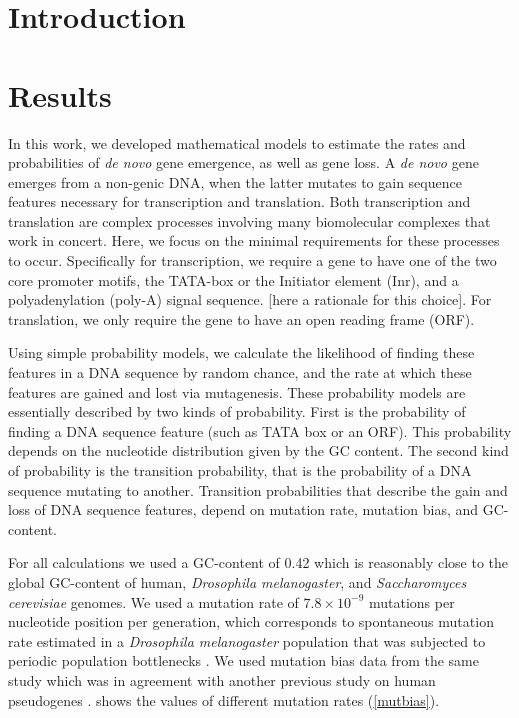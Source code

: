 \documentclass[12pt,a4paper]{article}
\begin{document}
\onehalfspacing

\setlength{\abovedisplayskip}{0pt}
\setlength{\belowdisplayskip}{1em}


\section{Introduction}

\section{Results}

In this work, we developed mathematical models to estimate the rates and probabilities of \textit{de novo} gene emergence, as well as gene loss. A \textit{de novo} gene emerges from a non-genic DNA, when the latter mutates to gain sequence features necessary for transcription and translation. Both transcription and translation are complex processes involving many biomolecular complexes that work in concert. Here, we focus on the minimal requirements for these processes to occur. Specifically for transcription, we require a gene to have one of the two core promoter motifs, the TATA-box or the Initiator element (Inr), and a polyadenylation (poly-A) signal sequence. [here a rationale for this choice]. For translation, we only require the gene to have an open reading frame (ORF). 

Using simple probability models, we calculate the likelihood of finding these features in a DNA sequence by random chance, and the rate at which these features are gained and lost via mutagenesis. These probability models are essentially described by two kinds of probability. First is the probability of finding a DNA sequence feature (such as TATA box or an ORF). This probability depends on the nucleotide distribution given by the GC content. The second kind of probability is the transition probability, that is the probability of a DNA sequence mutating to another. Transition probabilities that describe the gain and loss of DNA sequence features, depend on mutation rate, mutation bias, and GC-content. 

For all calculations we used a GC-content of 0.42 which is reasonably close to the global GC-content of human, \textit{Drosophila melanogaster}, and \textit{Saccharomyces cerevisiae} genomes. We used a mutation rate of $7.8\times10^{-9}$ mutations per nucleotide position per generation, which corresponds to spontaneous mutation rate estimated in a \textit{Drosophila melanogaster} population that was subjected to periodic population bottlenecks \cite[mutation accumulation line,][]{drosophilamutrate}. We used mutation bias data from the same study \citep{drosophilamutrate} which was in agreement with another previous study on human pseudogenes \citep{humanmutrate}. shows the values of different mutation rates (\autoref{mutbias}). 
\end{document}
